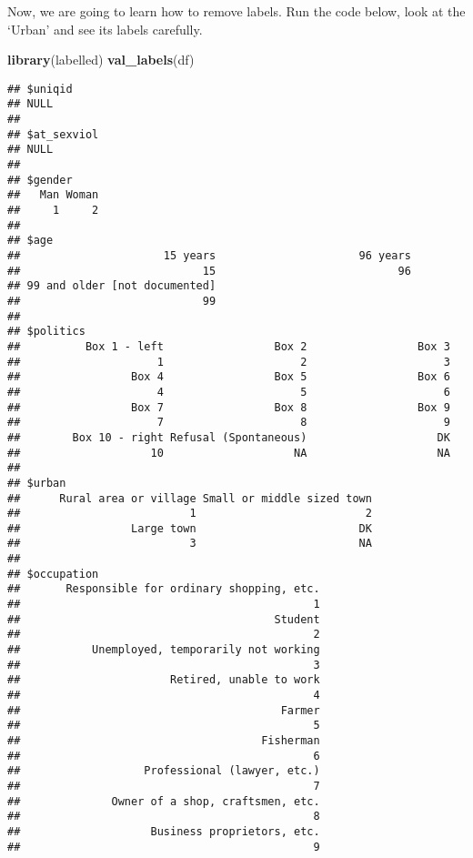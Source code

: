 \documentclass[
]{book}
\newenvironment{Shaded}{\begin{snugshade}}{\end{snugshade}}
\newcommand{\FunctionTok}[1]{\textcolor[rgb]{0.13,0.29,0.53}{\textbf{#1}}}
\newcommand{\NormalTok}[1]{#1}
\begin{document}
Now, we are going to learn how to remove labels. Run the code below, look at the `Urban' and see its labels carefully.

\begin{Shaded}
\begin{Highlighting}[]
\FunctionTok{library}\NormalTok{(labelled)}
\FunctionTok{val\_labels}\NormalTok{(df)}
\end{Highlighting}
\end{Shaded}

\begin{verbatim}
## $uniqid
## NULL
## 
## $at_sexviol
## NULL
## 
## $gender
##   Man Woman 
##     1     2 
## 
## $age
##                      15 years                      96 years 
##                            15                            96 
## 99 and older [not documented] 
##                            99 
## 
## $politics
##          Box 1 - left                 Box 2                 Box 3 
##                     1                     2                     3 
##                 Box 4                 Box 5                 Box 6 
##                     4                     5                     6 
##                 Box 7                 Box 8                 Box 9 
##                     7                     8                     9 
##        Box 10 - right Refusal (Spontaneous)                    DK 
##                    10                    NA                    NA 
## 
## $urban
##      Rural area or village Small or middle sized town 
##                          1                          2 
##                 Large town                         DK 
##                          3                         NA 
## 
## $occupation
##       Responsible for ordinary shopping, etc. 
##                                             1 
##                                       Student 
##                                             2 
##           Unemployed, temporarily not working 
##                                             3 
##                       Retired, unable to work 
##                                             4 
##                                        Farmer 
##                                             5 
##                                     Fisherman 
##                                             6 
##                   Professional (lawyer, etc.) 
##                                             7 
##              Owner of a shop, craftsmen, etc. 
##                                             8 
##                    Business proprietors, etc. 
##                                             9 

\end{verbatim}
\end{document}
